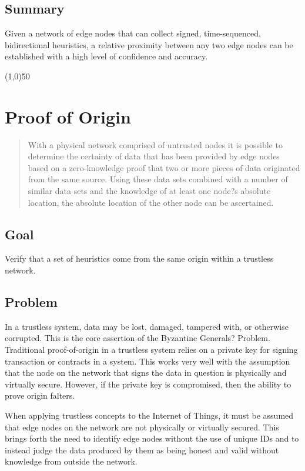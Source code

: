 \documentclass{article}
\begin{document}
\subsection {Summary}
Given a network of edge nodes that can collect signed, time-sequenced, bidirectional \glspl{heuristic}, a relative proximity between any two edge nodes can be established with a high level of confidence and \gls{accuracy}.

\begin{center}
\line(1,0){50}
\end{center}

\section {Proof of Origin}

\begin{abstract}
With a physical network comprised of untrusted nodes it is possible to determine the \gls{certainty} of data that has been provided by edge nodes based on a zero-knowledge proof that two or more pieces of data originated from the same source. Using these data sets combined with a number of similar data sets and the knowledge of at least one node?s absolute location, the absolute location of the other node can be ascertained.
\end{abstract}

\subsection {Goal}
Verify that a set of \glspl{heuristic} come from the same origin within a trustless network.

\subsection {Problem}
In a trustless system, data may be lost, damaged, tampered with, or otherwise corrupted. This is the core assertion of the Byzantine Generals? Problem. Traditional \Gls{proof-of-origin} in a trustless system relies on a private key for signing transaction or contracts in a system. This works very well with the assumption that the node on the network that signs the data in question is physically and virtually secure. However, if the private key is compromised, then the ability to prove origin falters.

When applying trustless concepts to the Internet of Things, it must be assumed that edge nodes on the network are not physically or virtually secured. This brings forth the need to identify edge nodes without the use of unique IDs and to instead judge the data produced by them as being honest and valid without knowledge from outside the network.
\end{document}
